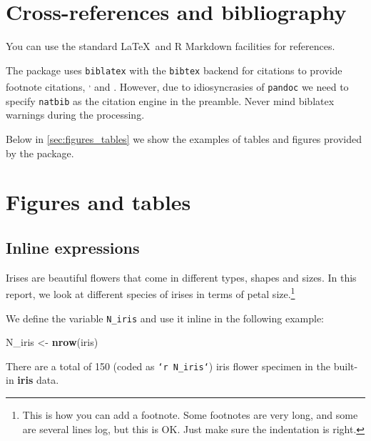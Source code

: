 \documentclass[
  freefonts, nologo]{amnestyreport}
\newenvironment{Shaded}{\begin{snugshade}}{\end{snugshade}}
\newcommand{\FunctionTok}[1]{\textcolor[rgb]{0.13,0.29,0.53}{\textbf{#1}}}
\newcommand{\NormalTok}[1]{#1}
\newcommand{\OtherTok}[1]{\textcolor[rgb]{0.56,0.35,0.01}{#1}}
\begin{document}
\clearpage

\section{\texorpdfstring{Cross-references and bibliography
\label{cross-ref}}{Cross-references and bibliography }}\label{cross-references-and-bibliography}

You can use the standard \LaTeX~and R Markdown facilities for
references.

The package uses \texttt{biblatex} with the \texttt{bibtex} backend for
citations to provide footnote citations,
\citep[See][]{SecondRef2022}\textsuperscript{,}\citep[See
also][12]{FirstRef2023} and \citep[23]{FirstRef2023}. However, due to
idiosyncrasies of \texttt{pandoc} we need to specify \texttt{natbib} as
the citation engine in the preamble. Never mind biblatex warnings during
the processing.

Below in \autoref{sec:figures_tables} we show the examples of tables and
figures provided by the package.

\section{\texorpdfstring{Figures and tables
\label{sec:figures_tables}}{Figures and tables }}\label{figures-and-tables}

\subsection{Inline expressions}\label{inline-expressions}

Irises are beautiful flowers that come in different types, shapes and
sizes. In this report, we look at different species of irises in terms
of petal
size.\footnote{This is how you can add a footnote. Some footnotes are very long, and some are several lines log, but this is OK. Just make sure the indentation is right.}

We define the variable \texttt{N\_iris} and use it inline in the
following example:

\begin{Shaded}
\begin{Highlighting}[]
\NormalTok{N\_iris }\OtherTok{\textless{}{-}} \FunctionTok{nrow}\NormalTok{(iris)}
\end{Highlighting}
\end{Shaded}

There are a total of 150 (coded as
\texttt{`}\texttt{r N\_iris}\texttt{`}) iris flower specimen in the
built-in \textbf{iris} data.
\end{document}
